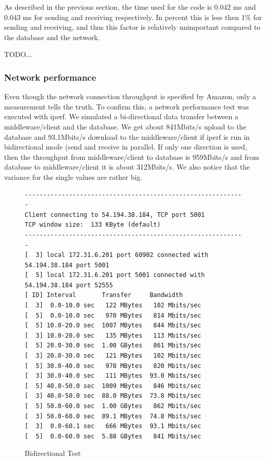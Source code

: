 \documentclass[milestone1.tex]{subfiles}
\begin{document}
As described in the previous section, the time used for the code is 0.042 ms and 0.043 ms for sending and receiving respectively. In percent this is less then 1\% for sending and receiving, and thus this factor is relatively unimportant compared to the database and the network.

TODO...


\subsubsection{Network performance}

Even though the network connection throughput is specified by Amazon, only a measurement tells the truth. To confirm this, a network performance test was executed with iperf. We simulated a bi-directional data transfer between a middleware/client and the database. We get about 841Mbits/s upload to the database and 93.1Mbits/s download to the middleware/client if iperf is run in bidirectional mode (send and receive in parallel. If only one direction is used, then the throughput from middleware/client to database is 959Mbits/s and from database to middleware/client it is about 312Mbits/s. We also notice that the variance for the single values are rather big.\\

\begin{figure}[H]
\begin{center}
\begin{verbatim}
------------------------------------------------------------
Client connecting to 54.194.38.184, TCP port 5001
TCP window size:  133 KByte (default)
------------------------------------------------------------
[  3] local 172.31.6.201 port 60902 connected with 54.194.38.184 port 5001
[  5] local 172.31.6.201 port 5001 connected with 54.194.38.184 port 52555
[ ID] Interval       Transfer     Bandwidth
[  3]  0.0-10.0 sec   122 MBytes   102 Mbits/sec
[  5]  0.0-10.0 sec   970 MBytes   814 Mbits/sec
[  5] 10.0-20.0 sec  1007 MBytes   844 Mbits/sec
[  3] 10.0-20.0 sec   135 MBytes   113 Mbits/sec
[  5] 20.0-30.0 sec  1.00 GBytes   861 Mbits/sec
[  3] 20.0-30.0 sec   121 MBytes   102 Mbits/sec
[  5] 30.0-40.0 sec   978 MBytes   820 Mbits/sec
[  3] 30.0-40.0 sec   111 MBytes  93.0 Mbits/sec
[  5] 40.0-50.0 sec  1009 MBytes   846 Mbits/sec
[  3] 40.0-50.0 sec  88.0 MBytes  73.8 Mbits/sec
[  5] 50.0-60.0 sec  1.00 GBytes   862 Mbits/sec
[  3] 50.0-60.0 sec  89.1 MBytes  74.8 Mbits/sec
[  3]  0.0-60.1 sec   666 MBytes  93.1 Mbits/sec
[  5]  0.0-60.0 sec  5.88 GBytes   841 Mbits/sec
\end{verbatim}
\end{center}
\caption{Bidirectional Test}
\label{fig:iperfclient}
\end{figure}
\end{document}
